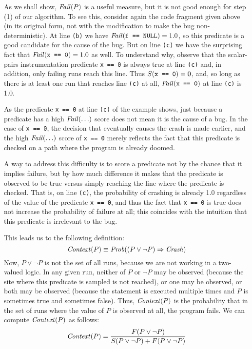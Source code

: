 As we shall show, $\mbox{\textit{Fail}}(P)$ is a useful measure, but it is not good
enough for step (1) of our algorithm. To see this, consider again the
code fragment given above (in its original form, not with the
modification to make the bug non-deterministic).  At line {\tt (b)} we
have $\mbox{\textit{Fail}}(\mbox{\tt f == NULL}) = 1.0$, so this predicate is a good
candidate for the cause of the bug.
But on line {\tt (c)} we have the surprising fact that $\mbox{\textit{Fail}}(\mbox{\tt x == 0}) = 1.0$ as well.
To understand why, observe that the scalar-pairs instrumentation
predicate \texttt{x == 0} is always true at line {\tt (c)} and, in
addition,
only failing runs reach this line.
Thus $S(\mbox{\tt x == 0}) = 0$, and, so long as there is at least one run that
reaches line {\tt (c)} at all, $\mbox{\textit{Fail}}(\mbox{\tt x == 0})$ at line {\tt (c)} is 1.0.

As the predicate {\tt x == 0} at line {\tt (c)} of the example
shows, just because a predicate has a high $\mbox{\textit{Fail}}(\ldots)$ score does not
mean it is the cause of a bug.  In the case of {\tt x == 0}, the
decision that eventually causes the crash is made earlier, and the
high $\mbox{\textit{Fail}}(\ldots)$ score of {\tt x == 0} merely reflects the fact that this
predicate is checked on a path where the program is already doomed.

A way to address this difficulty is to score a predicate not by the chance
that it implies failure, but by how much difference it makes that the predicate
is observed to be true versus simply reaching the line where the predicate is checked.
That is, on line {\tt (c)}, the probability of crashing is already 1.0 regardless
of the value of the predicate {\tt x == 0}, and thus the fact that {\tt x == 0} is
true does not increase the probability of failure at all; this coincides with
the intuition that this predicate is irrelevant to the bug.

This leads us to the following definition:
\[ \mbox{\textit{Context}}(P) \equiv \mbox{\textit{Prob}}((P \lor \lnot P) \Rightarrow \mbox{\textit{Crash}}) \]
Now, $P \lor \lnot P$ is not the set of all runs, because we are not working in a two-valued logic.
In any given run, neither of $P$ or $\lnot P$ may be observed (because the site where this predicate is
sampled is not reached), or one may be observed, or both may be observed (because the statement is executed
multiple times and $P$ is sometimes true and sometimes false).  Thus, $\mbox{\textit{Context}}(P)$ is the probability that
in the set of runs where the value of $P$ is observed at all, the program fails. We can compute $\mbox{\textit{Context}}(P)$ as follows:
\[ \mbox{\textit{Context}}(P) = \frac{F(P \lor \lnot P)}{S(P \lor \lnot P) + F(P \lor \lnot P)} \]

